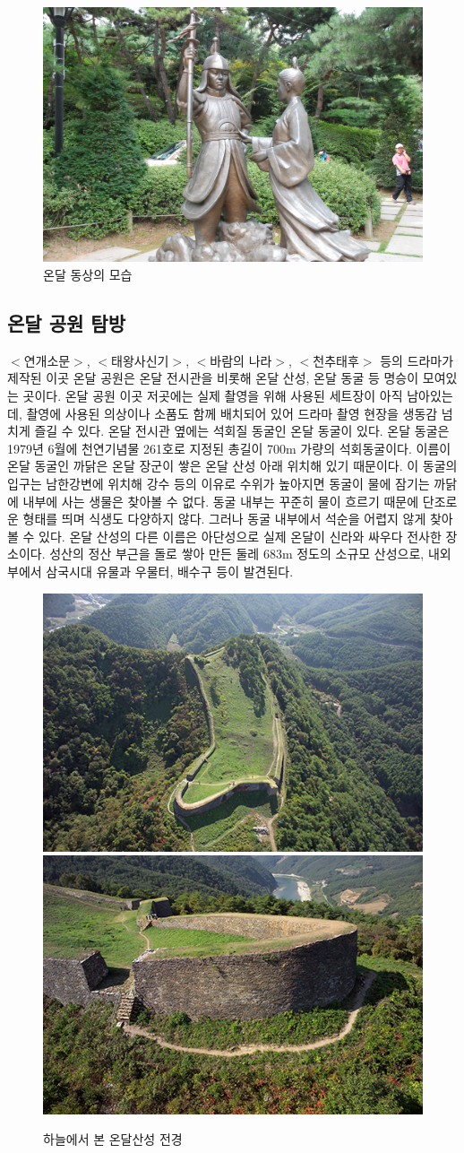 \begin{figure}
    \centering
    \includegraphics[width=.6\textwidth]{s_img/온달_사진.jpg}
    \caption{온달 동상의 모습}
    \label{fig:my_label_s4}
 \end{figure}

\subsection{온달 공원 탐방}
$<$연개소문$>$, $<$태왕사신기$>$, $<$바람의 나라$>$, $<$천추태후$>$ 등의 드라마가 제작된 이곳 온달 공원은 온달 전시관을 비롯해 온달 산성, 온달 동굴 등 명승이 모여있는 곳이다. 온달 공원 이곳 저곳에는 실제 촬영을 위해 사용된 세트장이 아직 남아있는데, 촬영에 사용된 의상이나 소품도 함께 배치되어 있어 드라마 촬영 현장을 생동감 넘치게 즐길 수 있다. 
온달 전시관 옆에는 석회질 동굴인 온달 동굴이 있다. 온달 동굴은 1979년 6월에 천연기념물 261호로 지정된 총길이 700m 가량의 석회동굴이다. 이름이 온달 동굴인 까닭은 온달 장군이 쌓은 온달 산성 아래 위치해 있기 때문이다. 이 동굴의 입구는 남한강변에 위치해 강수 등의 이유로 수위가 높아지면 동굴이 물에 잠기는 까닭에 내부에 사는 생물은 찾아볼 수 없다. 동굴 내부는 꾸준히 물이 흐르기 때문에 단조로운 형태를 띄며 식생도 다양하지 않다. 그러나 동굴 내부에서 석순을 어렵지 않게 찾아볼 수 있다. 
온달 산성의 다른 이름은 아단성으로 실제 온달이 신라와 싸우다 전사한 장소이다. 성산의 정산 부근을 돌로 쌓아 만든 둘레 683m 정도의 소규모 산성으로, 내외부에서 삼국시대 유물과 우물터, 배수구 등이 발견된다. 



\begin{figure}
    \centering
    \includegraphics[width=.4\textwidth]{s_img/온달산성_사진.JPG}
    \includegraphics[width=.4\textwidth]{s_img/온달산성_사진2.JPG}
    \caption{하늘에서 본 온달산성 전경}
    \label{fig:my_label_s5}
 \end{figure}

